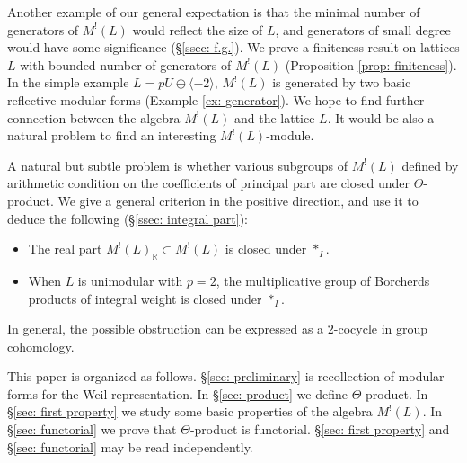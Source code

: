 \documentclass[12pt]{amsart}
\numberwithin{equation}{section}
\theoremstyle{definition}
\theoremstyle{remark}
\newcommand{\R}{\mathbb{R}}
\newcommand{\ML}{M^{!}(L)}
\newcommand{\MLZ}{M^{!}(L)_{\mathbb{Z}}}
\begin{document}
Another example of our general expectation is that 
the minimal number of generators of ${\ML}$ would reflect the size of $L$, 
and generators of small degree would have some significance (\S \ref{ssec: f.g.}). 
We prove a finiteness result on 
lattices $L$ with bounded number of generators of ${\ML}$ (Proposition \ref{prop: finiteness}). 
In the simple example $L=pU\oplus \langle -2 \rangle$, 
${\ML}$ is generated by two basic reflective modular forms (Example \ref{ex: generator}). 
We hope to find further connection between the algebra ${\ML}$ and the lattice $L$. 
It would be also a natural problem to find an interesting ${\ML}$-module. 


A natural but subtle problem is 
whether various subgroups of ${\ML}$ defined by 
arithmetic condition on the coefficients of principal part 
are closed under $\Theta$-product. 
We give a general criterion in the positive direction, 
and use it to deduce the following (\S \ref{ssec: integral part}): 
\begin{itemize}
\item The real part $M^!(L)_{{\R}}\subset {\ML}$ is closed under $\ast_{I}$.  
\item When $L$ is unimodular with $p=2$, 
the multiplicative group of Borcherds products of integral weight is closed under $\ast_{I}$. 
\end{itemize}
In general, the possible obstruction can be expressed as a $2$-cocycle in group cohomology. 




This paper is organized as follows. 
\S \ref{sec: preliminary} is recollection of modular forms for the Weil representation. 
In \S \ref{sec: product} we define $\Theta$-product. 
In \S \ref{sec: first property} we study some basic properties of the algebra ${\ML}$. 
In \S \ref{sec: functorial} we prove that $\Theta$-product is functorial. 
\S \ref{sec: first property} and \S \ref{sec: functorial} may be read independently. 
\end{document}
